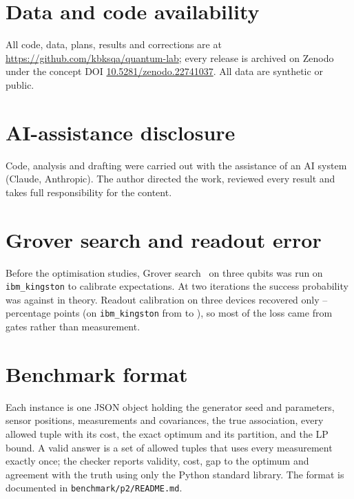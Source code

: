 \documentclass[11pt,a4paper]{article}
\begin{document}
\section*{Data and code availability}
All code, data, plans, results and corrections are at \url{https://github.com/kbksqa/quantum-lab}; every release is archived on Zenodo
under the concept DOI \href{https://doi.org/10.5281/zenodo.22741037}{10.5281/zenodo.22741037}. All data are synthetic or public.

\section*{AI-assistance disclosure}
Code, analysis and drafting were carried out with the assistance of an AI system (Claude, Anthropic). The author directed
the work, reviewed every result and takes full responsibility for the content.

\appendix
\section{Grover search and readout error}
Before the optimisation studies, Grover search~\cite{grover1996} on three qubits was run on \texttt{ibm\_kingston} to calibrate expectations.
At two iterations the success probability was \PzeroKingstonHardware{} against \PzeroKingstonTheory{} in theory. Readout calibration on three
devices recovered only \PzeroFiveGainMinPP--\PzeroFiveGainMaxPP{} percentage points (on \texttt{ibm\_kingston} from \PzeroFiveKingstonRaw{}
to \PzeroFiveKingstonCorrected), so most of the loss came from gates rather than measurement.

\section{Benchmark format}
Each instance is one JSON object holding the generator seed and parameters, sensor positions, measurements and covariances, the true
association, every allowed tuple with its cost, the exact optimum and its partition, and the LP bound. A valid answer is a set of allowed
tuples that uses every measurement exactly once; the checker reports validity, cost, gap to the optimum and agreement with the truth using
only the Python standard library. The format is documented in \texttt{benchmark/p2/README.md}.



\end{document}
